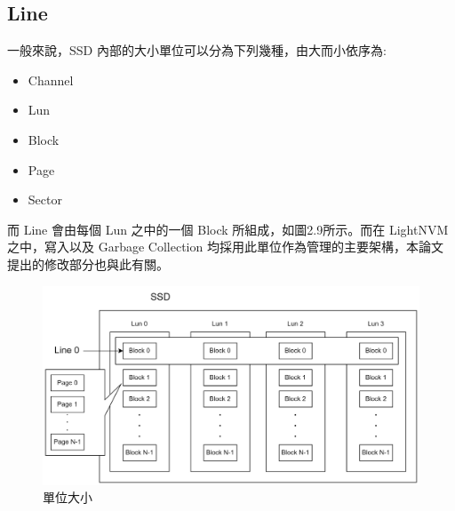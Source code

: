 \subsection{Line}\label{s2.4.1}
\indent
一般來說，SSD 內部的大小單位可以分為下列幾種，由大而小依序為:
\begin{itemize}
    \item Channel
    \item Lun
    \item Block
    \item Page
    \item Sector
\end{itemize}
而 Line 會由每個 Lun 之中的一個 Block 所組成，如圖2.9所示。而在 LightNVM 之中，寫入以及 Garbage Collection 均採用此單位作為管理的主要架構，本論文提出的修改部分也與此有關。
\begin{figure}[H]
    \centering
    \includegraphics[width=1\textwidth]{picture/ch2/Line.png}
    \caption{單位大小}
    \label{f2.9}
\end{figure}